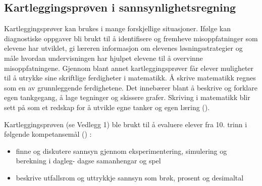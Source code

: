 \documentclass[main.tex]{subfiles}
\begin{document}
\subsection*{Kartleggingsprøven i sannsynlighetsregning}
Kartleggingsprøver kan brukes i mange forskjellige situasjoner. Ifølge  kan diagnostiske oppgaver 
bli brukt til å identifisere og fremheve misoppfatninger som elevene har utviklet, gi læreren informasjon
om elevenes løsningsstrategier og måle hvordan undervisningen har hjulpet elevene til å overvinne 
misoppfatningene. Gjennom blant annet kartleggingsprøver får elever muligheter til å utrykke sine skriftlige 
ferdigheter i matematikk. Å skrive matematikk regnes som en av grunnleggende ferdighetene. Det innebærer blant 
å beskrive og forklare egen tankgegang, å lage tegninger og skissere grafer. Skriving i matematikk blir sett på som 
et redskap for å utvikle egne tanker og egen læring (). 

Kartleggingsprøven (se Vedlegg 1) ble brukt til å evaluere elever fra 10. trinn i følgende kompetansemål 
() :
\begin{itemize}
\item finne og diskutere sannsyn gjennom eksperimentering, simulering og berekning i dagleg-
dagse samanhengar og spel
\item beskrive utfallsrom og uttrykkje sannsyn som brøk, prosent og desimaltal
\end{itemize}
\end{document}
